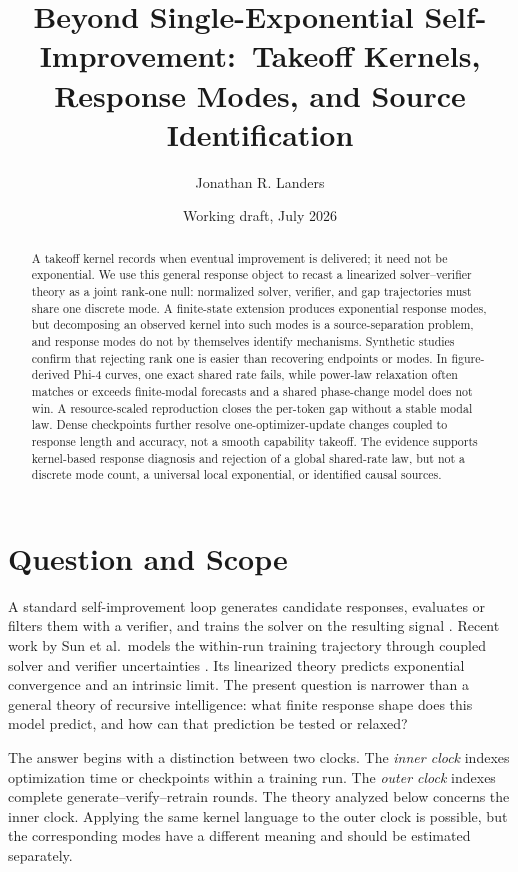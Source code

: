 \documentclass[10pt,twocolumn]{article}
\title{\vspace{-1.0em}Beyond Single-Exponential Self-Improvement:\
Takeoff Kernels, Response Modes, and Source Identification}
\author{Jonathan R. Landers}
\date{Working draft, July 2026}
\begin{document}
\maketitle
\vspace{-1.3em}

\begin{abstract}
A takeoff kernel records when eventual improvement is delivered; it need not
be exponential.  We use this general response object to recast a linearized
solver--verifier theory as a joint rank-one null: normalized solver, verifier,
and gap trajectories must share one discrete mode.  A finite-state extension
produces exponential response modes, but decomposing an observed kernel into
such modes is a source-separation problem, and response modes do not by
themselves identify mechanisms.  Synthetic studies confirm that rejecting
rank one is easier than recovering endpoints or modes.  In figure-derived
Phi-4 curves, one exact shared rate fails, while power-law relaxation often
matches or exceeds finite-modal forecasts and a shared phase-change model does
not win.  A resource-scaled reproduction closes the per-token gap without a
stable modal law.  Dense checkpoints further resolve one-optimizer-update
changes coupled to response length and accuracy, not a smooth capability
takeoff.  The evidence supports kernel-based response diagnosis and rejection
of a global shared-rate law, but not a discrete mode count, a universal local
exponential, or identified causal sources.
\end{abstract}

\section{Question and Scope}

A standard self-improvement loop generates candidate responses, evaluates or
filters them with a verifier, and trains the solver on the resulting signal
\cite{huang2025,song2025}.  Recent work by Sun et al.\ models the within-run
training trajectory through coupled solver and verifier uncertainties
\cite{sun2026}.  Its linearized theory predicts exponential convergence and an
intrinsic limit.  The present question is narrower than a general theory of
recursive intelligence: what finite response shape does this model predict,
and how can that prediction be tested or relaxed?

The answer begins with a distinction between two clocks.  The \emph{inner
clock} indexes optimization time or checkpoints within a training run.  The
\emph{outer clock} indexes complete generate--verify--retrain rounds.  The
theory analyzed below concerns the inner clock.  Applying the same kernel
language to the outer clock is possible, but the corresponding modes have a
different meaning and should be estimated separately.
\end{document}
